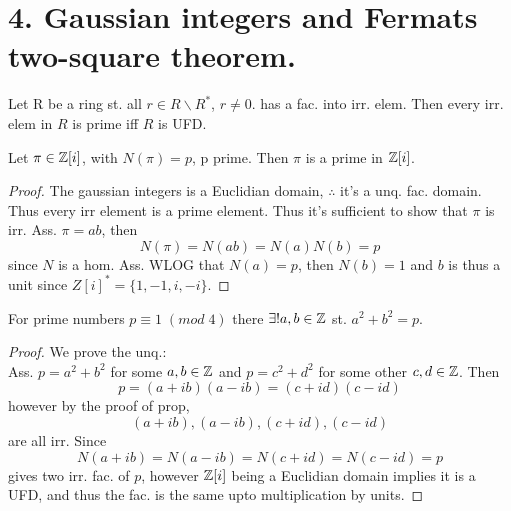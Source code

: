 \chapter*{4. Gaussian integers and Fermats two-square theorem.}

\begin{proposition}
  Let R be a ring st. all $r \in R \backslash R^{*}$, $r \neq 0$. has a fac. into irr. elem. Then every irr. elem in $R$ is prime iff $R$ is UFD.
\end{proposition}

\begin{proposition}
Let $\pi \in \mathbb{Z} [i]$, with $N(\pi) = p$, p prime. Then $\pi$ is a prime in $\mathbb{Z}[i]$.
\end{proposition}
\begin{proof}
  The gaussian integers is a Euclidian domain, $\therefore$ it's a unq. fac. domain. Thus every irr element is a prime element. Thus it's sufficient to show that $\pi$ is irr. Ass. $\pi = ab$, then
  \begin{equation*}
    N(\pi) = N(ab) = N(a)N(b) = p
  \end{equation*}
  since $N$ is a hom. Ass. WLOG that $N(a) = p$, then $N(b) = 1$ and $b$ is thus a unit
  since $Z[i]^{*} = \{1, -1, i, -i\}$.
\end{proof}

\begin{theorem}
  For prime numbers $p \equiv 1 \; (mod \; 4)$ there $\exists! a, b \in \mathbb{Z}$ st. $a^{2} + b^{2} = p$.
\end{theorem}
\begin{proof}
  We prove the unq.: \\
  Ass. $p = a^{2} + b^{2}$ for some $a, b \in \mathbb{Z}$ and $p = c^{2} + d^{2}$ for some other $c, d \in \mathbb{Z}$. Then
  \begin{equation*}
    p = (a + i b)(a - i b) = (c + i d)(c - i d)
  \end{equation*}
  however by the proof of prop,
  \begin{equation*}
    (a + ib), (a - ib), (c + i d), (c - i d)
  \end{equation*}
  are all irr. Since
  \begin{equation*}
    N(a + ib) = N(a - ib) = N(c + i d) = N(c - i d) = p
  \end{equation*}
  gives two irr. fac. of $p$, however $\mathbb{Z}[i]$ being a Euclidian domain implies it is a UFD, and thus the fac. is the same upto multiplication by units.
\end{proof}
